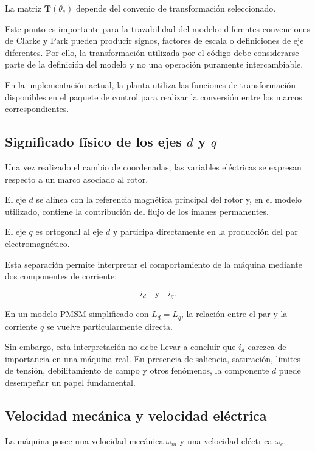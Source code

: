La matriz $\mathbf{T}(\theta_e)$ depende del convenio de transformación seleccionado.

Este punto es importante para la trazabilidad del modelo: diferentes convenciones de Clarke y Park pueden producir signos, factores de escala o definiciones de eje diferentes. Por ello, la transformación utilizada por el código debe considerarse parte de la definición del modelo y no una operación puramente intercambiable.

En la implementación actual, la planta utiliza las funciones de transformación disponibles en el paquete de control para realizar la conversión entre los marcos correspondientes.

\subsection{\texorpdfstring{Significado físico de los ejes $d$ y $q$}{Significado físico de los ejes d y q}}

Una vez realizado el cambio de coordenadas, las variables eléctricas se expresan respecto a un marco asociado al rotor.

El eje $d$ se alinea con la referencia magnética principal del rotor y, en el modelo utilizado, contiene la contribución del flujo de los imanes permanentes.

El eje $q$ es ortogonal al eje $d$ y participa directamente en la producción del par electromagnético.

Esta separación permite interpretar el comportamiento de la máquina mediante dos componentes de corriente:

\begin{equation}
i_d
\quad\text{y}\quad
i_q.
\end{equation}

En un modelo PMSM simplificado con $L_d=L_q$, la relación entre el par y la corriente $q$ se vuelve particularmente directa.

Sin embargo, esta interpretación no debe llevar a concluir que $i_d$ carezca de importancia en una máquina real. En presencia de saliencia, saturación, límites de tensión, debilitamiento de campo y otros fenómenos, la componente $d$ puede desempeñar un papel fundamental.

\subsection{Velocidad mecánica y velocidad eléctrica}

La máquina posee una velocidad mecánica $\omega_m$ y una velocidad eléctrica $\omega_e$.


